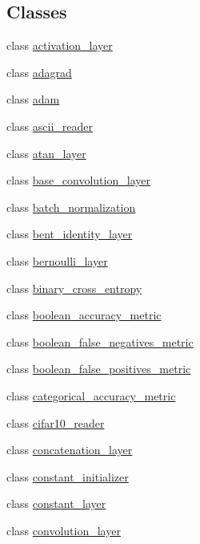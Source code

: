 \subsection*{Classes}
\begin{DoxyCompactItemize}
\item 
class \hyperlink{classlbann_1_1activation__layer}{activation\+\_\+layer}
\item 
class \hyperlink{classlbann_1_1adagrad}{adagrad}
\item 
class \hyperlink{classlbann_1_1adam}{adam}
\item 
class \hyperlink{classlbann_1_1ascii__reader}{ascii\+\_\+reader}
\item 
class \hyperlink{classlbann_1_1atan__layer}{atan\+\_\+layer}
\item 
class \hyperlink{classlbann_1_1base__convolution__layer}{base\+\_\+convolution\+\_\+layer}
\item 
class \hyperlink{classlbann_1_1batch__normalization}{batch\+\_\+normalization}
\item 
class \hyperlink{classlbann_1_1bent__identity__layer}{bent\+\_\+identity\+\_\+layer}
\item 
class \hyperlink{classlbann_1_1bernoulli__layer}{bernoulli\+\_\+layer}
\item 
class \hyperlink{classlbann_1_1binary__cross__entropy}{binary\+\_\+cross\+\_\+entropy}
\item 
class \hyperlink{classlbann_1_1boolean__accuracy__metric}{boolean\+\_\+accuracy\+\_\+metric}
\item 
class \hyperlink{classlbann_1_1boolean__false__negatives__metric}{boolean\+\_\+false\+\_\+negatives\+\_\+metric}
\item 
class \hyperlink{classlbann_1_1boolean__false__positives__metric}{boolean\+\_\+false\+\_\+positives\+\_\+metric}
\item 
class \hyperlink{classlbann_1_1categorical__accuracy__metric}{categorical\+\_\+accuracy\+\_\+metric}
\item 
class \hyperlink{classlbann_1_1cifar10__reader}{cifar10\+\_\+reader}
\item 
class \hyperlink{classlbann_1_1concatenation__layer}{concatenation\+\_\+layer}
\item 
class \hyperlink{classlbann_1_1constant__initializer}{constant\+\_\+initializer}
\item 
class \hyperlink{classlbann_1_1constant__layer}{constant\+\_\+layer}
\item 
class \hyperlink{classlbann_1_1convolution__layer}{convolution\+\_\+layer}

\end{DoxyCompactItemize}
